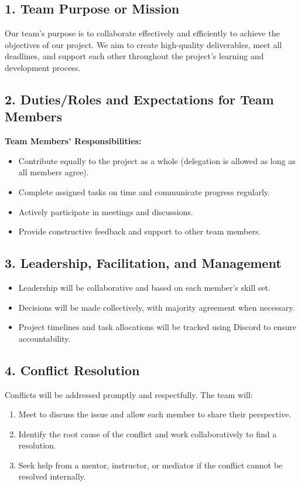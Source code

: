 \documentclass{article}
\begin{document}
\vspace{0.5cm}

\subsection*{1. Team Purpose or Mission}
Our team’s purpose is to collaborate effectively and efficiently to achieve the objectives of our project. We aim to create high-quality deliverables, meet all deadlines, and support each other throughout the project's learning and development process.

\subsection*{2. Duties/Roles and Expectations for Team Members}

\textbf{Team Members’ Responsibilities:}
\begin{itemize}
    \item Contribute equally to the project as a whole (delegation is allowed as long as all members agree).
    \item Complete assigned tasks on time and communicate progress regularly.
    \item Actively participate in meetings and discussions.
    \item Provide constructive feedback and support to other team members.
\end{itemize}

\subsection*{3. Leadership, Facilitation, and Management}
\begin{itemize}
    \item Leadership will be collaborative and based on each member’s skill set.
    \item Decisions will be made collectively, with majority agreement when necessary.
    \item Project timelines and task allocations will be tracked using Discord to ensure accountability.
\end{itemize}

\subsection*{4. Conflict Resolution}
Conflicts will be addressed promptly and respectfully. The team will:
\begin{enumerate}
    \item Meet to discuss the issue and allow each member to share their perspective.
    \item Identify the root cause of the conflict and work collaboratively to find a resolution.
    \item Seek help from a mentor, instructor, or mediator if the conflict cannot be resolved internally.
\end{enumerate}
\end{document}
